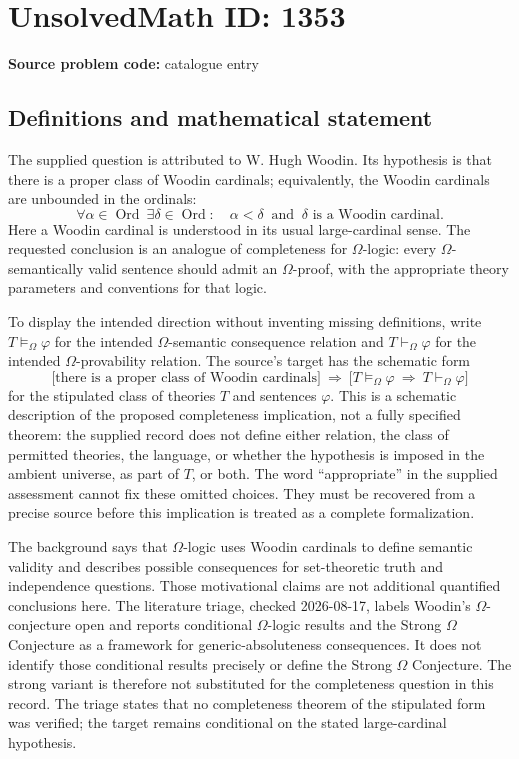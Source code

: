 \documentclass[11pt]{article}
\begin{document}
\section*{UnsolvedMath ID: 1353}
\textbf{Source problem code:} catalogue entry
\subsection{Definitions and mathematical statement}
The supplied question is attributed to W. Hugh Woodin. Its hypothesis is that there is a proper class of Woodin cardinals; equivalently, the Woodin cardinals are unbounded in the ordinals:
\[
\forall\alpha\in\operatorname{Ord}\ \exists\delta\in\operatorname{Ord}:\quad
\alpha<\delta\ \text{ and }\ \delta\text{ is a Woodin cardinal}.
\]
Here a Woodin cardinal is understood in its usual large-cardinal sense. The requested conclusion is an analogue of completeness for $\Omega$-logic: every $\Omega$-semantically valid sentence should admit an $\Omega$-proof, with the appropriate theory parameters and conventions for that logic.

To display the intended direction without inventing missing definitions, write $T\models_{\Omega}\varphi$ for the intended $\Omega$-semantic consequence relation and $T\vdash_{\Omega}\varphi$ for the intended $\Omega$-provability relation. The source's target has the schematic form
\[
\bigl[\text{there is a proper class of Woodin cardinals}\bigr]
\ \Longrightarrow\ 
\bigl[T\models_{\Omega}\varphi\ \Longrightarrow\ T\vdash_{\Omega}\varphi\bigr]
\]
for the stipulated class of theories $T$ and sentences $\varphi$. This is a schematic description of the proposed completeness implication, not a fully specified theorem: the supplied record does not define either relation, the class of permitted theories, the language, or whether the hypothesis is imposed in the ambient universe, as part of $T$, or both. The word ``appropriate'' in the supplied assessment cannot fix these omitted choices. They must be recovered from a precise source before this implication is treated as a complete formalization.

The background says that $\Omega$-logic uses Woodin cardinals to define semantic validity and describes possible consequences for set-theoretic truth and independence questions. Those motivational claims are not additional quantified conclusions here. The literature triage, checked 2026-08-17, labels Woodin's $\Omega$-conjecture open and reports conditional $\Omega$-logic results and the Strong $\Omega$ Conjecture as a framework for generic-absoluteness consequences. It does not identify those conditional results precisely or define the Strong $\Omega$ Conjecture. The strong variant is therefore not substituted for the completeness question in this record. The triage states that no completeness theorem of the stipulated form was verified; the target remains conditional on the stated large-cardinal hypothesis.
\end{document}
